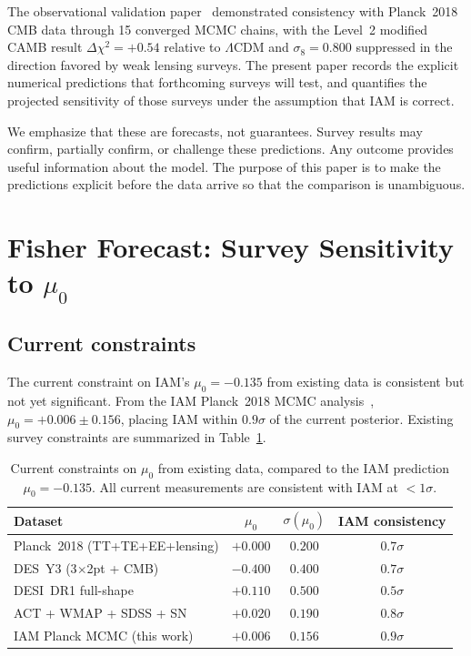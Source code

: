 \documentclass[12pt,a4paper]{article}
\begin{document}
The observational validation paper~\citep{Mahaffey2026a} demonstrated consistency
with Planck~2018 CMB data through 15 converged MCMC chains, with the Level~2
modified CAMB result $\Delta\chi^2 = +0.54$ relative to $\Lambda$CDM and
$\sigma_8 = 0.800$ suppressed in the direction favored by weak lensing surveys.
The present paper records the explicit numerical predictions that forthcoming
surveys will test, and quantifies the projected sensitivity of those surveys
under the assumption that IAM is correct.

We emphasize that these are forecasts, not guarantees. Survey results may confirm,
partially confirm, or challenge these predictions. Any outcome provides useful
information about the model. The purpose of this paper is to make the predictions
explicit before the data arrive so that the comparison is unambiguous.

\section{Fisher Forecast: Survey Sensitivity to $\mu_0$}

\subsection{Current constraints}

The current constraint on IAM's $\mu_0 = -0.135$ from existing data is consistent
but not yet significant. From the IAM Planck~2018 MCMC analysis~\citep{Mahaffey2026a},
$\mu_0 = +0.006 \pm 0.156$, placing IAM within $0.9\sigma$ of the current
posterior. Existing survey constraints are summarized in
Table~\ref{tab:current_constraints}.

\begin{table}[h]
\centering
\caption{Current constraints on $\mu_0$ from existing data, compared to the IAM
prediction $\mu_0 = -0.135$. All current measurements are consistent with IAM
at $< 1\sigma$.}
\label{tab:current_constraints}
\begin{tabular}{lccc}
\toprule
Dataset & $\mu_0$ & $\sigma(\mu_0)$ & IAM consistency \\
\midrule
Planck~2018 (TT+TE+EE+lensing) & $+0.000$ & $0.200$ & $0.7\sigma$ \\
DES~Y3 (3$\times$2pt + CMB) & $-0.400$ & $0.400$ & $0.7\sigma$ \\
DESI~DR1 full-shape & $+0.110$ & $0.500$ & $0.5\sigma$ \\
ACT + WMAP + SDSS + SN & $+0.020$ & $0.190$ & $0.8\sigma$ \\
IAM Planck MCMC (this work) & $+0.006$ & $0.156$ & $0.9\sigma$ \\
\bottomrule
\end{tabular}
\end{table}
\end{document}
